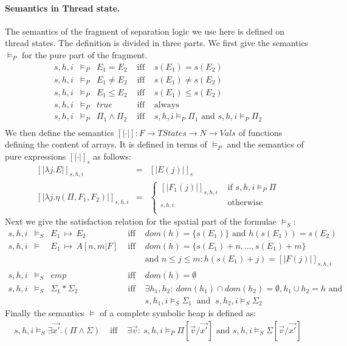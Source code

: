 \documentclass[a4paper,11pt]{llncs}
\newcommand{\vals}{\mathit{Vals}}
\newcommand{\tstates}{\mathit{TStates}}
\newcommand{\psto}{{\,{\mapsto}\,}}
\newcommand{\sem}[1]{[ \! | #1 | \! ]}
\begin{document}
\paragraph{Semantics in Thread state. }
The semantics of the fragment of separation logic we use here is defined on thread states. The definition is divided in three parts. We first give the semantics $\models_P$ for the pure part of the fragment. 
\[\begin{array}{lclll}
s,h,i & \models_P & E_1 = E_2  & \mbox{ iff } & s(E_1) = s(E_2)\\
s,h,i & \models_P & E_1 \neq E_2 & \mbox{ iff } & s(E_1) \neq s(E_2) \\
s,h,i & \models_P & E_1 \leq E_2 & \mbox{ iff } & s(E_1) \leq s(E_2) \\ 
s,h,i & \models_P & true & \mbox{ iff } & \mbox{always }\\
s,h,i & \models_P & \Pi_1 \wedge \Pi_2  & \mbox{ iff } &  s,h,i \models_P \Pi_1 \mbox{ and } s,h,i\models_P \Pi_2 \\
\end{array}\]
We then define the semantics $\sem{\cdot}: F \rightarrow \tstates \rightarrow N \rightarrow  \vals$ of functions defining the content of arrays. It is defined in terms of $\models_P$ and the semantics of pure expressions $\sem{\cdot}_s$ as follows:
\[
\begin{array}{lcl}
\sem{\lambda j. E}_{s,h,i} & = & \sem{E(j)}_s 
\\[2ex]
\sem{\lambda j . \eta(\Pi, F_1, F_2)}_{s,h,i} & = & \left\{\begin{array}{ll}
	\sem{F_1(j)}_{s,h,i} & \mbox{ if $s,h,i \models_P \Pi$} 
	\\
	\sem{F_2(j)}_{s,h,i} & \mbox{ otherwise}
	\\
	\end{array}
	\right.
\end{array}
\]
Next we give the satisfaction relation for the spatial part of the formulae $\models_S$:
\[\begin{array}{lclll}
s,h,i & \models_S & E_1 \psto E_2 & \mbox{ iff } &  dom(h)=\{ s(E_1)\} \mbox{ and } h(s(E_1))=s(E_2)\\ 
s,h,i & \models & E_1 \psto A[n, m | F]  & \mbox{ iff } & dom(h)=\{s(E_1)+n,\dots,s(E_1)+m \} 
\\ & & & & \mbox{and } n\leq j \leq m: h(s(E_1)+j)=\sem{F(j)}_{s,h,i} \\
s,h,i & \models_S & emp & \mbox{ iff } & dom(h)=\emptyset\\ 
s,h,i & \models_S & \Sigma_1 * \Sigma_2 & \mbox{ iff } & \exists h_1,h_2{:}  \ dom(h_1) \cap dom(h_2) = \emptyset, h_1 \cup h_2 = h \mbox{ and} \\
& &   & &  s,h_1,i \models_S \Sigma_1 \ \mbox{ and } \ s,h_2,i \models_S \Sigma_2 
\end{array}\]
Finally the semantics $\models$ of a complete symbolic heap is defined as:
\begin{eqnarray*}
s,h,i  \models_S  \exists \vec {x'} .(\Pi \wedge \Sigma) & \mbox{ iff } & \exists \vec v{:} \ 
s,h,i \models_P \Pi[\vec v/\vec {x'}]  \mbox{ and } s,h,i \models_S \Sigma[\vec v / \vec{x'}]
\end{eqnarray*}
\end{document}
